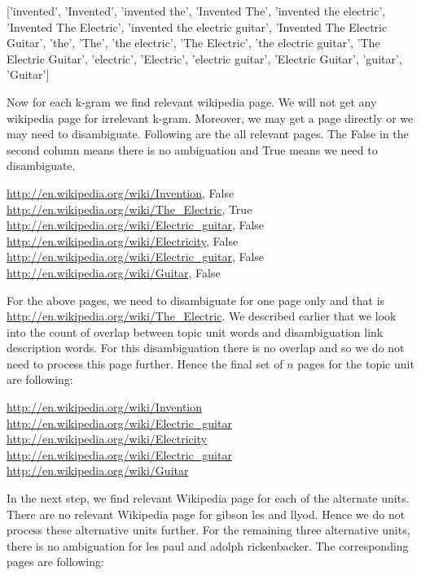 \documentclass[11pt]{article}
\begin{document}
['invented', 'Invented', 'invented the', 'Invented The', 'invented the electric', 'Invented The Electric', 'invented the electric guitar', 'Invented The Electric Guitar', 'the', 'The', 'the electric', 'The Electric', 'the electric guitar', 'The Electric Guitar', 'electric', 'Electric', 'electric guitar', 'Electric Guitar', 'guitar', 'Guitar'] 

Now for each k-gram we find relevant wikipedia page. We will not get any wikipedia page for irrelevant k-gram.  Moreover, we may get a page directly or we may need to disambiguate. Following are the all relevant pages. The False in the second column means there is no ambiguation and True means we need to disambiguate.

\url{http://en.wikipedia.org/wiki/Invention}, False\\
\url{http://en.wikipedia.org/wiki/The_Electric}, True \\
\url{http://en.wikipedia.org/wiki/Electric_guitar}, False\\
\url{http://en.wikipedia.org/wiki/Electricity}, False \\
\url{http://en.wikipedia.org/wiki/Electric_guitar}, False \\
\url{http://en.wikipedia.org/wiki/Guitar}, False

For the above pages, we need to disambiguate for one page only and that is \url{http://en.wikipedia.org/wiki/The_Electric}. We described earlier that we look into the count of overlap between topic unit words and disambiguation link description words. For this disambiguation there is no overlap and so we do not need to process this page further. Hence the final set of $n$ pages for the topic unit are following:

\url{http://en.wikipedia.org/wiki/Invention} \\
\url{http://en.wikipedia.org/wiki/Electric_guitar} \\
\url{http://en.wikipedia.org/wiki/Electricity} \\
\url{http://en.wikipedia.org/wiki/Electric_guitar} \\
\url{http://en.wikipedia.org/wiki/Guitar}

In the next step, we find relevant Wikipedia page for each of the alternate units. There are no relevant Wikipedia page for  gibson les and llyod. Hence we do not process these alternative units further. For the remaining three alternative units, there is no ambiguation for les paul and adolph rickenbacker. The corresponding pages are following:
\end{document}
